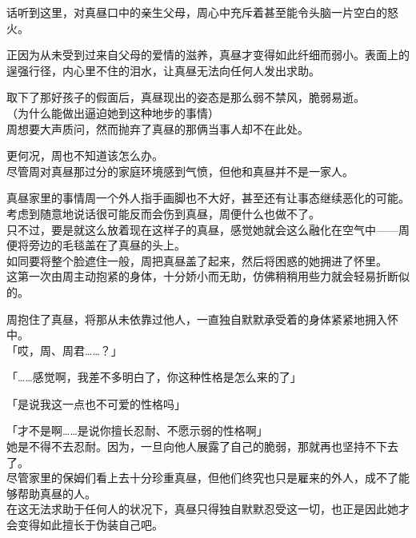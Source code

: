 话听到这里，对真昼口中的亲生父母，周心中充斥着甚至能令头脑一片空白的怒火。

正因为从未受到过来自父母的爱情的滋养，真昼才变得如此纤细而弱小。表面上的逞强行径，内心里不住的泪水，让真昼无法向任何人发出求助。\\

\vspace{2\baselineskip}

取下了那好孩子的假面后，真昼现出的姿态是那么弱不禁风，脆弱易逝。\\

（为什么能做出逼迫她到这种地步的事情）\\

周想要大声质问，然而抛弃了真昼的那俩当事人却不在此处。

更何况，周也不知道该怎么办。\\

尽管周对真昼那过分的家庭环境感到气愤，但他和真昼并不是一家人。

真昼家里的事情周一个外人指手画脚也不大好，甚至还有让事态继续恶化的可能。考虑到随意地说话很可能反而会伤到真昼，周便什么也做不了。\\

只不过，要是就这么放着现在这样子的真昼，感觉她就会这么融化在空气中——周便将旁边的毛毯盖在了真昼的头上。\\

如同要将整个脸遮住一般，周把真昼盖了起来，然后将困惑的她拥进了怀里。\\

这第一次由周主动抱紧的身体，十分娇小而无助，仿佛稍稍用些力就会轻易折断似的。

周抱住了真昼，将那从未依靠过他人，一直独自默默承受着的身体紧紧地拥入怀中。\\

「哎，周、周君……？」

「……感觉啊，我差不多明白了，你这种性格是怎么来的了」

「是说我这一点也不可爱的性格吗」

「才不是啊……是说你擅长忍耐、不愿示弱的性格啊」\\

她是不得不去忍耐。因为，一旦向他人展露了自己的脆弱，那就再也坚持不下去了。\\

尽管家里的保姆们看上去十分珍重真昼，但他们终究也只是雇来的外人，成不了能够帮助真昼的人。\\

在这无法求助于任何人的状况下，真昼只得独自默默忍受这一切，也正是因此她才会变得如此擅长于伪装自己吧。\\

